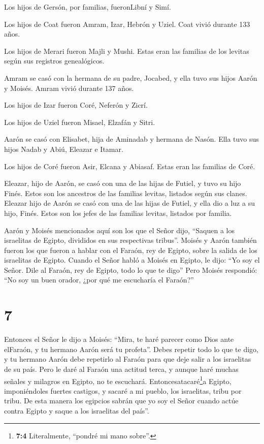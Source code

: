  Los hijos de Gersón, por familias, fueronLibní y Simí.

 Los hijos de Coat fueron Amram, Izar, Hebrón y Uziel. Coat
vivió durante 133 años.

 Los hijos de Merari fueron Majli y Mushi. Estas eran las
familias de los levitas según sus registros genealógicos.

 Amram se casó con la hermana de su padre, Jocabed, y ella
tuvo sus hijos Aarón y Moisés. Amram vivió durante 137 años.

 Los hijos de Izar fueron Coré, Neferón y Zicrí.

 Los hijos de Uziel fueron Misael, Elzafán y Sitri.

 Aarón se casó con Elisabet, hija de Aminadab y hermana de
Nasón. Ella tuvo sus hijos Nadab y Abiú, Eleazar e Itamar.

 Los hijos de Coré fueron Asir, Elcana y Abiasaf. Estas
eran las familias de Coré.

 Eleazar, hijo de Aarón, se casó con una de las hijas de
Futiel, y tuvo su hijo Finés. Estos son los ancestros de las familias
levitas, listados según sus clanes. Eleazar hijo de Aarón se casó con
una de las hijas de Futiel, y ella dio a luz a su hijo, Finés. Estos son
los jefes de las familias levitas, listados por familia.

 Aarón y Moisés mencionados aquí son los que el Señor dijo,
``Saquen a los israelitas de Egipto, divididos en sus respectivas
tribus''.  Moisés y Aarón también fueron los que fueron a
hablar con el Faraón, rey de Egipto, sobre la salida de los israelitas
de Egipto.  Cuando el Señor habló a Moisés en Egipto,
 le dijo: ``Yo soy el Señor. Dile al Faraón, rey de Egipto,
todo lo que te digo''  Pero Moisés respondió: ``No soy un
buen orador, ¿por qué me escucharía el Faraón?''

\hypertarget{section-6}{%
\section{7}\label{section-6}}

 Entonces el Señor le dijo a Moisés: ``Mira, te haré parecer
como Dios ante elFaraón, y tu hermano Aarón será tu profeta''.
 Debes repetir todo lo que te digo, y tu hermano Aarón debe
repetirlo al Faraón para que deje salir a los israelitas de su país.
 Pero le daré al Faraón una actitud terca, y aunque haré
muchas señales y milagros en Egipto, no te escuchará. 
Entoncesatacaré\footnote{\textbf{7:4} Literalmente, ``pondré mi mano
  sobre''.}a Egipto, imponiéndoles fuertes castigos, y sacaré a mi
pueblo, los israelitas, tribu por tribu.  De esta manera los
egipcios sabrán que yo soy el Señor cuando actúe contra Egipto y saque a
los israelitas del país''.

